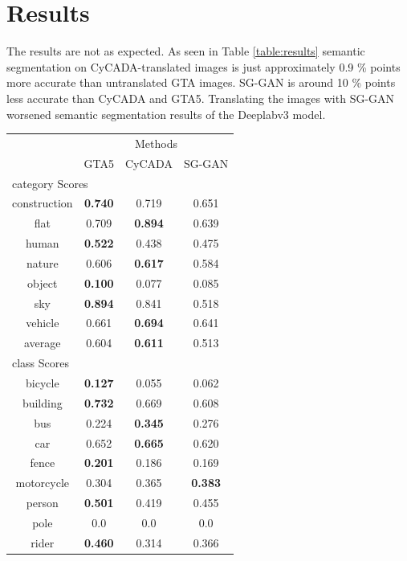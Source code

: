 \section{Results}
The results are not as expected. As seen in Table \ref{table:results} semantic segmentation on CyCADA-translated images is just approximately 0.9 \% points more accurate than untranslated GTA images. SG-GAN is around 10 \% points less accurate than CyCADA and GTA5. Translating the images with SG-GAN worsened semantic segmentation results of the Deeplabv3 model. 
\begin{table}
	\centering
	\begin{tabular}{|c|c|c|c|}
		\multicolumn{1}{c}{} & \multicolumn{3}{c}{Methods}\\
		\cline{2-4}
		\multicolumn{1}{c|}{}& GTA5 & CyCADA & SG-GAN \\ 
		\cline{2-4}
		\multicolumn{4}{l}{category Scores}\\
		\hline
		construction & \textbf{0.740} & 0.719 & 0.651 \\ 
		\hline 
		flat & 0.709 & \textbf{0.894} & 0.639 \\ 
		\hline 
		human & \textbf{0.522} & 0.438 & 0.475 \\ 
		\hline 
		nature & 0.606 & \textbf{0.617} & 0.584 \\ 
		\hline 
		object & \textbf{0.100} & 0.077 & 0.085 \\ 
		\hline 
		sky & \textbf{0.894} & 0.841 & 0.518 \\ 
		\hline 
		vehicle & 0.661 & \textbf{0.694} & 0.641 \\ 
		\hline \hline
		average & 0.604 & \textbf{0.611} & 0.513\\
		\hline
		\multicolumn{4}{l}{class Scores}\\
		\hline
		bicycle & \textbf{0.127} & 0.055 & 0.062 \\ 
		\hline 
		building & \textbf{0.732} & 0.669 & 0.608 \\ 
		\hline 
		bus & 0.224 & \textbf{0.345} & 0.276 \\ 
		\hline 
		car & 0.652 & \textbf{0.665} & 0.620 \\ 
		\hline 
		fence & \textbf{0.201} & 0.186 & 0.169 \\ 
		\hline 
		motorcycle & 0.304 & 0.365 & \textbf{0.383} \\ 
		\hline 
		person & \textbf{0.501} & 0.419 & 0.455 \\ 
		\hline 
		pole & 0.0 & 0.0 & 0.0 \\ 
		\hline 
		rider & \textbf{0.460} & 0.314 & 0.366 \\ 

\end{tabular}
\end{table}

